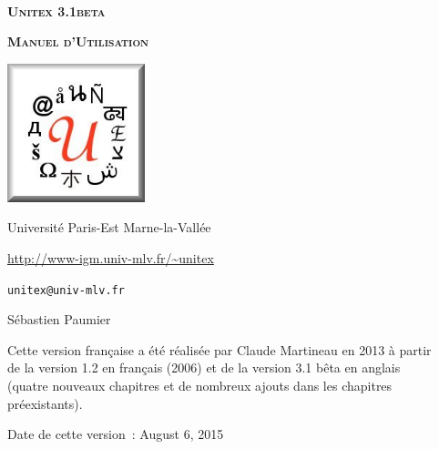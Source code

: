 
\begin{titlepage}
\begin{center}

~

\vspace{3cm}
\Huge
\textsc{\textbf{Unitex 3.1beta}}

\vspace{1cm}

\huge
\textsc{\textbf{Manuel d'Utilisation}}

\vspace{2cm}

  \begin{center}
    \includegraphics[width=4cm]{resources/img/logo-Unitex.png}
  \end{center}
\normalsize

\vspace{2cm}

\LARGE

Université Paris-Est Marne-la-Vallée
\bigskip
\normalsize

\url{http://www-igm.univ-mlv.fr/~unitex}

\verb$unitex@univ-mlv.fr$

\vspace{1cm}

Sébastien Paumier
\bigskip

Cette version française a été réalisée par Claude Martineau en 2013 à partir\\
de la version 1.2 en français (2006) et de la version 3.1 bêta en anglais \\
(quatre nouveaux chapitres et de nombreux ajouts dans les chapitres préexistants).
\bigskip

Date de cette version~: August 6, 2015

\end{center}

\end{titlepage}
